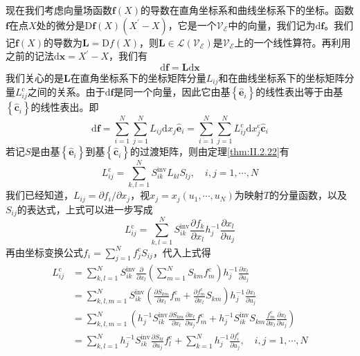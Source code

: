 \documentclass[../main.tex]{subfiles}
\begin{document}
现在我们考虑向量场函数$\mathbf{f}\left(X\right)$的导数在直角坐标系和曲线坐标系下的坐标。函数$\mathbf{f}$在点$X$处的微分是$\mathrm{D}\mathbf{f}\left(X\right)\left(X^\prime-X\right)$，它是一个$\mathcal{V}_{\mathcal{E}}$中的向量，我们记为$\mathrm{d}\mathbf{f}$。我们记$\mathbf{f}\left(X\right)$的导数为$\mathbf{L}=\mathrm{D}f\left(X\right)$，则$\mathbf{L}\in\mathcal{L}\left(\mathcal{V}_{\mathcal{E}}\right)$是$\mathcal{V}_{\mathcal{E}}$上的一个线性算符。再利用之前的记法$\mathrm{d}\mathbf{x}=X^\prime-X$，我们有
\[\mathrm{d}\mathbf{f}=\mathbf{L}\mathrm{d}\mathbf{x}\]
我们关心的是$\mathbf{L}$在直角坐标系下的坐标矩阵分量$L_{ij}$和在曲线坐标系下的坐标矩阵分量$L_{ij}^\mathrm{c}$之间的关系。由于$\mathrm{d}\mathbf{f}$是同一个向量，因此它由基$\left\{\mathbf{\hat{e}}_i\right\}$的线性表出等于由基$\left\{\mathbf{\hat{c}}_i\right\}$的线性表出。即
\[\mathrm{d}\mathbf{f}=\sum_{i=1}^N\sum_{j=1}^N L_{ij}\mathrm{d}x_j\mathbf{\hat{e}}_i=\sum_{i=1}^N\sum_{j=1}^NL_{ij}^\mathrm{c}\mathrm{d}x_j^\mathrm{c}\mathbf{\hat{c}}_i\]
若记$S$是由基$\left\{\mathbf{\hat{e}}_i\right\}$到基$\left\{\mathbf{\hat{c}}_i\right\}$的过渡矩阵，则由定理\ref{thm:II.2.22}有
\[L_{ij}^\mathrm{c}=\sum_{k,l=1}^N S_{ik}^\mathrm{inv}L_{kl}S_{lj},\quad i,j=1,\cdots,N\]
我们已经知道，$L_{ij}=\partial f_i/\partial x_j$，视$x_j=x_j\left(u_1,\cdots,u_N\right)$为映射$T$的分量函数，以及$S_{ij}$的表达式，上式可以进一步写成
\[L_{ij}^\mathrm{c}=\sum_{k,l=1}^NS_{ik}^\mathrm{inv}\frac{\partial f_k}{\partial x_l}h_j^{-1}\frac{\partial x_l}{\partial u_j}\]
再由坐标变换公式$f_i=\sum_{j=1}^N f_j^\mathrm{c}S_{ij}$，代入上式得
\[
    \begin{aligned}
        L_{ij}^\mathrm{c} & =\sum_{k,l=1}^NS_{ik}^\mathrm{inv}\frac{\partial}{\partial x_l}\left(\sum_{m=1}^N S_{km}f_m^\mathrm{c}\right)h_j^{-1}\frac{\partial x_l}{\partial u_j}                                                                                             \\
                          & =\sum_{k,l,m=1}^NS_{ik}^\mathrm{inv}\left(\frac{\partial S_{km}}{\partial x_l}f_m^\mathrm{c}+\frac{\partial f_m^\mathrm{c}}{\partial x_l}S_{km}\right)h_j^{-1}\frac{\partial x_l}{\partial u_j}                                                    \\
                          & =\sum_{k,l,m=1}^N\left(h_j^{-1}S_{ik}^\mathrm{inv}\frac{\partial S_{km}}{\partial x_l}\frac{\partial x_l}{\partial u_j}f_m^\mathrm{c}+h_j^{-1}S_{ik}^\mathrm{inv}S_{km}\frac{f_m^\mathrm{c}}{\partial x_l}\frac{\partial x_l}{\partial u_j}\right) \\
                          & =\sum_{k,l=1}^Nh_j^{-1}S_{ik}^\mathrm{inv}\frac{\partial S_{kl}}{\partial u_j}f_l^\mathrm{c}+\sum_{k=1}^Nh_j^{-1}\frac{\partial f_i^\mathrm{c}}{\partial u_j},\quad i,j=1,\cdots,N
    \end{aligned}
\]
\end{document}
